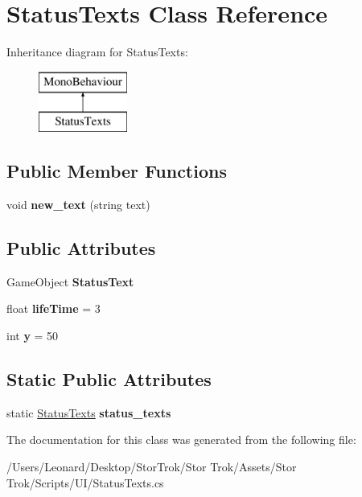 \hypertarget{class_status_texts}{}\section{Status\+Texts Class Reference}
\label{class_status_texts}
Inheritance diagram for Status\+Texts\+:\begin{figure}[H]
\begin{center}
\leavevmode
\includegraphics[height=2.000000cm]{class_status_texts}
\end{center}
\end{figure}
\subsection*{Public Member Functions}
\begin{DoxyCompactItemize}
\item 
\mbox{\label{class_status_texts_ad906f5558cbf5ecf9ecfad3460a90155}} 
void {\bfseries new\+\_\+text} (string text)
\end{DoxyCompactItemize}
\subsection*{Public Attributes}
\begin{DoxyCompactItemize}
\item 
\mbox{\label{class_status_texts_af047d5b3edfbf994dae251291c979d4f}} 
Game\+Object {\bfseries Status\+Text}
\item 
\mbox{\label{class_status_texts_a1bd1bd8c572d026e9aadf98b61c7e2d7}} 
float {\bfseries life\+Time} = 3
\item 
\mbox{\label{class_status_texts_a8aa2d510776aafe2f8efa4ab3a40d66f}} 
int {\bfseries y} = 50
\end{DoxyCompactItemize}
\subsection*{Static Public Attributes}
\begin{DoxyCompactItemize}
\item 
\mbox{\label{class_status_texts_a937571cc9f2e1c0286cf4e3fa43e31df}} 
static \hyperlink{class_status_texts}{Status\+Texts} {\bfseries status\+\_\+texts}
\end{DoxyCompactItemize}


The documentation for this class was generated from the following file\+:\begin{DoxyCompactItemize}
\item 
/\+Users/\+Leonard/\+Desktop/\+Stor\+Trok/\+Stor Trok/\+Assets/\+Stor Trok/\+Scripts/\+U\+I/Status\+Texts.\+cs\end{DoxyCompactItemize}
